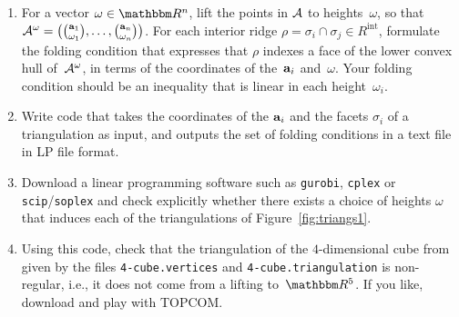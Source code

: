 \begin{enumerate}
  \item
    For a vector $\omega\in\RR^n$, lift the points in $\mathcal{A}$ to heights~$\omega$, so that
    $\mathcal{A}^\omega=\big(\binom{\mathbf{a}_1}{\omega_1},\dots,\binom{\mathbf{a}_n}{\omega_n}\big)$.
    For each interior ridge $\rho=\sigma_i\cap\sigma_j\in R^{\text{int}}$,
    formulate the folding condition that expresses that $\rho$ indexes a face of the lower convex hull of~$\mathcal{A}^\omega$,
    in terms of the coordinates of the~$\mathbf{a}_i$ and~$\omega$.
    Your folding condition should be an inequality that is linear in each height~$\omega_i$.

  \item
    Write code that takes the coordinates of the $\mathbf{a}_i$ and the facets $\sigma_i$ of a triangulation as input,
    and outputs the set of folding conditions in a text file in
    LP file format.

  \item
    Download a linear programming software such as
    \texttt{gurobi},
    \texttt{cplex} or
    \texttt{scip}/\texttt{soplex}
    and check explicitly whether there exists a choice of heights $\omega$ that induces each of the triangulations of Figure~\ref{fig:triangs1}.

  \item
    Using this code,
    check that the triangulation of the $4$-dimensional cube from~\cite{deLoera96}
    given by the files \texttt{4-cube.vertices} and \texttt{4-cube.triangulation}
    is non-regular, i.e., it does not come from a lifting to~$\RR^5$.
    If you like, download and play with TOPCOM.
  \end{enumerate}
